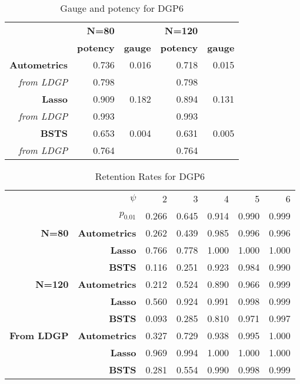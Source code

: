 \documentclass[11pt, oneside]{book}   	%
\begin{document}
\begin{table}[htbp]
  \centering

    \begin{tabular}{rrrrr}

          & \textbf{N=80} & \textbf{} & \textbf{N=120} & \textbf{} \\

          & \textbf{potency} & \textbf{gauge} & \textbf{potency} & \textbf{gauge} \\
    \textbf{Autometrics} & 0.736 & 0.016 & 0.718 & 0.015 \\
    \textit{from LDGP} & 0.798 &       & 0.798 &  \\
    \textbf{Lasso} & 0.909 & 0.182 & 0.894 & 0.131 \\
    \textit{from LDGP} & 0.993 &       & 0.993 &  \\
    \textbf{BSTS} & 0.653 & 0.004 & 0.631 & 0.005 \\
    \textit{from LDGP} & 0.764 &       & 0.764 &  \\

    \end{tabular}%
      \caption{Gauge and potency for DGP6}
  \label{DGP6GP}%
\end{table}%




\begin{table}[htbp]
  \centering

    \begin{tabular}{rrrrrrr}

          & \boldmath{}\textbf{$\psi$}\unboldmath{} & 2    & 3     & 4    & 5     & 6 \\

          & \textbf{$p_{0.01}$}\unboldmath{}  & 0.266 & 0.645 & 0.914 & 0.990 & 0.999  \\
    \textbf{N=80} & \textbf{Autometrics} & 0.262 & 0.439 & 0.985 & 0.996 & 0.996 \\
    \textbf{} & \textbf{Lasso} & 0.766 & 0.778 & 1.000 & 1.000 & 1.000 \\
    \textbf{} & \textbf{BSTS} & 0.116 & 0.251 & 0.923 & 0.984 & 0.990 \\
    \textbf{N=120} & \textbf{Autometrics} & 0.212 & 0.524 & 0.890 & 0.966 & 0.999 \\
    \textbf{} & \textbf{Lasso} & 0.560 & 0.924 & 0.991 & 0.998 & 0.999 \\
    \textbf{} & \textbf{BSTS} & 0.093 & 0.285 & 0.810 & 0.971 & 0.997 \\
    \textbf{From LDGP} & \textbf{Autometrics} & 0.327 & 0.729 & 0.938 & 0.995 & 1.000 \\
          & \textbf{Lasso} & 0.969 & 0.994 & 1.000 & 1.000 & 1.000 \\
          & \textbf{BSTS} & 0.281 & 0.554 & 0.990 & 0.998 & 0.999 \\

    \end{tabular}%
      \caption{Retention Rates for DGP6}
  \label{DGP6RetRates}%
\end{table}%
\end{document}
